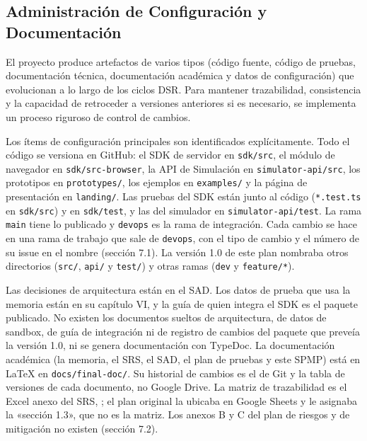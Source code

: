 \subsection{Administración de Configuración y Documentación}

El proyecto produce artefactos de varios tipos (código fuente, código de pruebas, documentación técnica, documentación académica y datos de configuración) que evolucionan a lo largo de los ciclos DSR. Para mantener trazabilidad, consistencia y la capacidad de retroceder a versiones anteriores si es necesario, se implementa un proceso riguroso de control de cambios.

Los ítems de configuración principales son identificados explícitamente. Todo el código se versiona en GitHub: el SDK de servidor en \texttt{sdk/src}, el módulo de navegador en \texttt{sdk/src-browser}, la API de Simulación en \texttt{simulator-api/src}, los prototipos en \texttt{prototypes/}, los ejemplos en \texttt{examples/} y la página de presentación en \texttt{landing/}. Las pruebas del SDK están junto al código (\texttt{*.test.ts} en \texttt{sdk/src}) y en \texttt{sdk/test}, y las del simulador en \texttt{simulator-api/test}. La rama \texttt{main} tiene lo publicado y \texttt{devops} es la rama de integración. Cada cambio se hace en una rama de trabajo que sale de \texttt{devops}, con el tipo de cambio y el número de su issue en el nombre (sección 7.1). La versión 1.0 de este plan nombraba otros directorios (\texttt{src/}, \texttt{api/} y \texttt{test/}) y otras ramas (\texttt{dev} y \texttt{feature/*}).

Las decisiones de arquitectura están en el SAD. Los datos de prueba que usa la memoria están en su capítulo VI, y la guía de quien integra el SDK es el paquete publicado. No existen los documentos sueltos de arquitectura, de datos de sandbox, de guía de integración ni de registro de cambios del paquete que preveía la versión 1.0, ni se genera documentación con TypeDoc. La documentación académica (la memoria, el SRS, el SAD, el plan de pruebas y este SPMP) está en LaTeX en \texttt{docs/final-doc/}. Su historial de cambios es el de Git y la tabla de versiones de cada documento, no Google Drive. La matriz de trazabilidad es el Excel anexo del SRS, ; el plan original la ubicaba en Google Sheets y le asignaba la «sección 1.3», que no es la matriz. Los anexos B y C del plan de riesgos y de mitigación no existen (sección 7.2).

